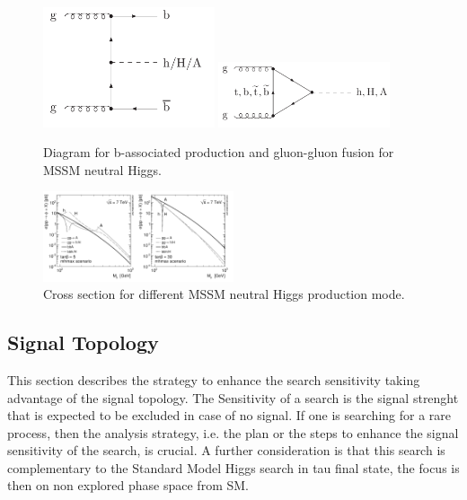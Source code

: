 \begin{figure}[tp]
     \begin{center}

            \includegraphics[width=0.45\textwidth]{figure/bba.png}
            \includegraphics[width=0.45\textwidth]{figure/ggf.png}

    \end{center}
    \caption{Diagram for b-associated production and gluon-gluon fusion for MSSM neutral Higgs.}
   \label{fig:prod}
\end{figure}

\begin{figure}[tp]
     \begin{center}

            \includegraphics[width=0.5\textwidth]{figure/xsec.png}

    \end{center}
    \caption{Cross section for different MSSM neutral Higgs production mode.}
   \label{fig:xsec}
\end{figure}

\subsection{Signal Topology}
This section describes the strategy to enhance the search sensitivity 
taking advantage of the signal topology.
The Sensitivity of a search is the signal strenght that is expected to be  excluded 
in case of no signal. If one is searching for a rare process, then the analysis strategy, i.e. the
plan or the steps to enhance the signal sensitivity of the search, is crucial.
A further consideration is that this search is complementary to the Standard Model
Higgs search in tau final state, the focus is then on non explored phase space from SM.

